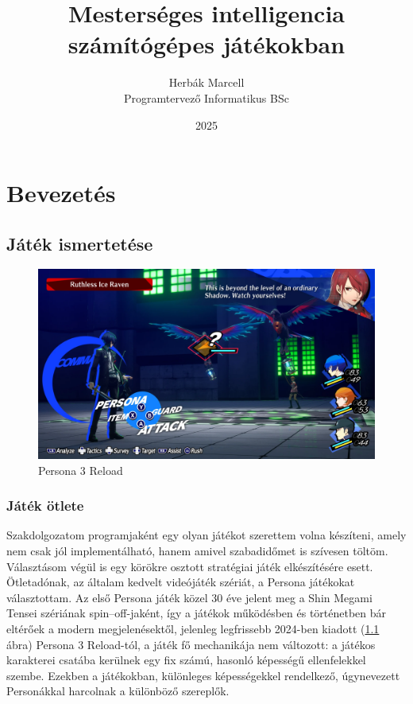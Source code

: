 \documentclass[
]{thesis-ekf}
\theoremstyle{definition}
\theoremstyle{remark}
\begin{document}
\title{Mesterséges intelligencia számítógépes játékokban}
\author{Herbák Marcell\\Programtervező Informatikus BSc}
\date{2025}
\maketitle

\tableofcontents

\chapter{Bevezetés}

\section{Játék ismertetése}

\begin{figure}[h!]
	\centering
	\includegraphics[width=14cm]{./pictures/persona3_xbox.png}
	\caption{Persona 3 Reload}
	\label{persona3}
\end{figure}

\subsection{Játék ötlete}

Szakdolgozatom programjaként egy olyan játékot szerettem volna készíteni, amely nem csak jól implementálható, hanem amivel szabadidőmet is szívesen töltöm. Választásom végül is egy körökre osztott stratégiai játék elkészítésére esett. Ötletadónak, az általam kedvelt videójáték szériát, a Persona játékokat választottam. Az első Persona játék közel 30 éve jelent meg a Shin Megami Tensei szériának spin--off-jaként, így a játékok működésben és történetben bár eltérőek a modern megjelenésektől, jelenleg legfrissebb 2024-ben kiadott (\ref{persona3} ábra) Persona 3 Reload-tól, a játék fő mechanikája nem változott: a játékos karakterei csatába kerülnek egy fix számú, hasonló képességű ellenfelekkel szembe. Ezekben a játékokban, különleges képességekkel rendelkező, úgynevezett Personákkal harcolnak a különböző szereplők.\cite{Persona,Persona3}
\end{document}
